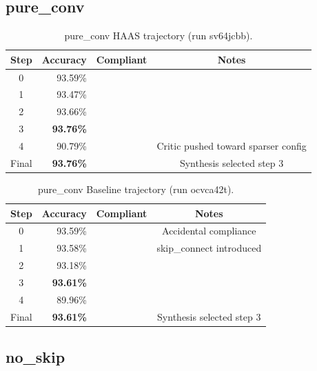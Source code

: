 \documentclass[10pt]{article}
\newcommand{\cmark}{\ding{51}}
\newcommand{\xmark}{\ding{55}}
\begin{document}
\subsection{pure\_conv}

\begin{table}[H]
\caption{pure\_conv HAAS trajectory (run sv64jcbb).}
\begin{center}
\small
\begin{tabular}{crcc}
\toprule
Step & Accuracy & Compliant & Notes \\
\midrule
0     & 93.59\% & \cmark &\\
1     & 93.47\% & \cmark &\\
2     & 93.66\% & \cmark &\\
3     & \textbf{93.76\%} & \cmark &\\
4     & 90.79\% & \cmark &Critic pushed toward sparser config \\
Final & \textbf{93.76\%} & \cmark &Synthesis selected step 3 \\
\bottomrule
\end{tabular}
\end{center}
\end{table}

\begin{table}[H]
\caption{pure\_conv Baseline trajectory (run ocvca42t).}
\begin{center}
\small
\begin{tabular}{crcc}
\toprule
Step & Accuracy & Compliant & Notes \\
\midrule
0     & 93.59\% & \cmark &Accidental compliance \\
1     & 93.58\% & \xmark & skip\_connect introduced \\
2     & 93.18\% & \xmark & \\
3     & \textbf{93.61\%} & \xmark & \\
4     & 89.96\% & \xmark & \\
Final & \textbf{93.61\%} & \xmark & Synthesis selected step 3 \\
\bottomrule
\end{tabular}
\end{center}
\end{table}

\subsection{no\_skip}
\end{document}
